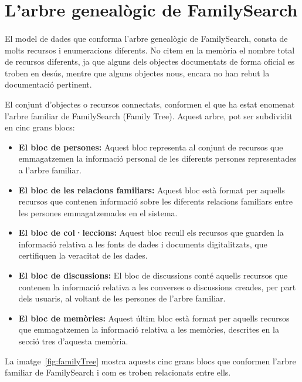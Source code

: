 \section{L'arbre genealògic de FamilySearch}

    \paragraph{}
    El model de dades que conforma l'arbre genealògic de FamilySearch, consta de molts recursos i enumeracions diferents. No citem en la memòria el nombre total de recursos diferents, ja que alguns dels objectes documentats de forma oficial es troben en desús, mentre que alguns objectes nous, encara no han rebut la documentació pertinent.

    El conjunt d'objectes o recursos connectats, conformen el que ha estat enomenat l'arbre familiar de FamilySearch (Family Tree). Aquest arbre, pot ser subdividit en cinc grans blocs:

    \begin{itemize}
        \item \textbf{El bloc de persones:} Aquest bloc representa al conjunt de recursos que emmagatzemen la informació personal de les diferents persones representades a l'arbre familiar.
        \item \textbf{El bloc de les relacions familiars:} Aquest bloc està format per aquells recursos que contenen informació sobre les diferents relacions familiars entre les persones emmagatzemades en el sistema.
        \item \textbf{El bloc de col·leccions:} Aquest bloc recull els recursos que guarden la informació relativa a les fonts de dades i documents digitalitzats, que certifiquen la veracitat de les dades.
        \item \textbf{El bloc de discussions:} El bloc de discussions conté aquells recursos que contenen la informació relativa a les converses o discussions creades, per part dels usuaris, al voltant de les persones de l'arbre familiar.
        \item \textbf{El bloc de memòries:} Aquest últim bloc està format per aquells recursos que emmagatzemen la informació relativa a les memòries, descrites en la secció tres d'aquesta memòria.
    \end{itemize}

    La imatge~\ref{fig:familyTree} mostra aquests cinc grans blocs que conformen l'arbre familiar de FamilySearch i com es troben relacionats entre ells.

